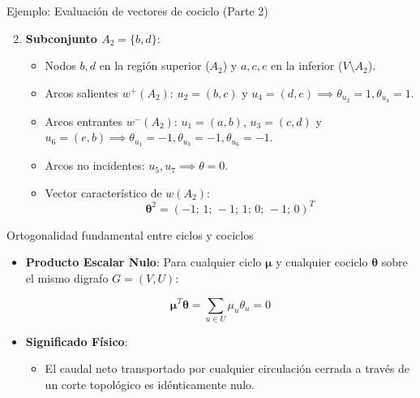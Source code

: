\documentclass[
  ignorenonframetext,
]{beamer}
\providecommand{\tightlist}{%
  \setlength{\itemsep}{0pt}\setlength{\parskip}{0pt}}
\begin{document}
\begin{frame}{Ejemplo: Evaluación de vectores de cociclo (Parte 2)}
\label{ejemplo-evaluaciuxf3n-de-vectores-de-cociclo-parte-2}
\begin{enumerate}
\setcounter{enumi}{1}
\tightlist
\item
  \textbf{Subconjunto \(A_2 = \{b, d\}\)}:

  \begin{itemize}
  \tightlist
  \item
    Nodos \(b, d\) en la región superior (\(A_2\)) y \(a, c, e\) en la
    inferior (\(V \setminus A_2\)).
  \item
    Arcos salientes \(w^+(A_2)\): \(u_2=(b,c)\) y
    \(u_4=(d,e) \implies \theta_{u_2} = 1, \theta_{u_4} = 1\).
  \item
    Arcos entrantes \(w^-(A_2)\): \(u_1=(a,b)\), \(u_3=(c,d)\) y
    \(u_6=(e,b) \implies \theta_{u_1} = -1, \theta_{u_3} = -1, \theta_{u_6} = -1\).
  \item
    Arcos no incidentes: \(u_5, u_7 \implies \theta = 0\).
  \item
    Vector característico de \(w(A_2)\):
    \[\mathbf{\theta}^2 = (-1;\, 1;\, -1;\, 1;\, 0;\, -1;\, 0)^T\]
  \end{itemize}
\end{enumerate}
\end{frame}

\begin{frame}{Ortogonalidad fundamental entre ciclos y cociclos}
\label{ortogonalidad-fundamental-entre-ciclos-y-cociclos}
\begin{itemize}
\item
  \textbf{Producto Escalar Nulo}: Para cualquier ciclo \(\mathbf{\mu}\)
  y cualquier cociclo \(\mathbf{\theta}\) sobre el mismo digrafo
  \(G = (V, U)\):

  \[
  \mathbf{\mu}^T \mathbf{\theta} = \sum_{u \in U} \mu_u \theta_u = 0
  \]
\item
  \textbf{Significado Físico}:

  \begin{itemize}
  \tightlist
  \item
    El caudal neto transportado por cualquier circulación cerrada a
    través de un corte topológico es idénticamente nulo.
  \end{itemize}
\end{itemize}
\end{frame}
\end{document}

